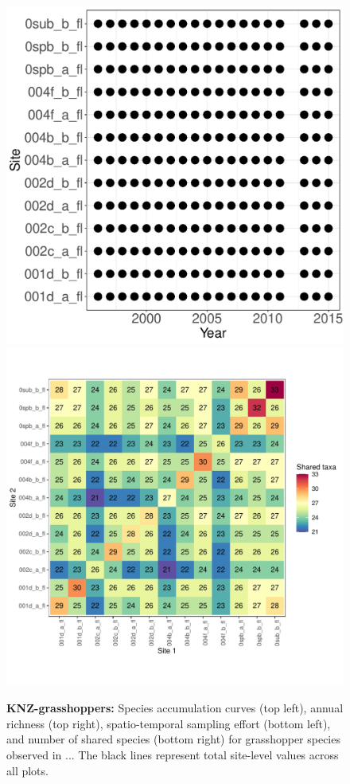 \documentclass[11pt, oneside]{article}
\begin{document}
\begin{figure}[h!]
\includegraphics[scale = 0.4]{knz-grasshopper-compagnoni_spatiotemporal_sampling_effort.pdf}
\includegraphics[scale = 0.4]{knz-grasshopper-compagnoni_spp_shared.pdf}
\caption{{\bf KNZ-grasshoppers:} Species accumulation curves (top left),  annual richness (top right), spatio-temporal sampling effort (bottom left), and number of shared species (bottom right) for grasshopper species observed in ... The black lines represent total site-level values across all plots.}
\label{knz-grasshoppers}
\end{figure}
\end{document}
